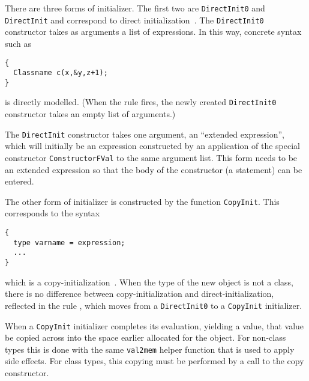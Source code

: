 \documentclass[11pt]{article}
\begin{document}
There are three forms of initializer.  The first two are
\texttt{DirectInit0} and \texttt{DirectInit} and correspond to direct
initialization~\cite[\S 8.5 paragraph 12]{cpp-standard-iso14882}.  The
\texttt{DirectInit0} constructor takes as arguments a list of
expressions.  In this way, concrete syntax such as
\begin{verbatim}
{
  Classname c(x,&y,z+1);
}
\end{verbatim}
is directly modelled.  (When the rule  fires,
the newly created \texttt{DirectInit0} constructor takes an empty list
of arguments.)

The \texttt{DirectInit} constructor takes one argument, an ``extended
expression'', which will initially be an expression constructed by an
application of the special constructor
\texttt{ConstructorFVal}
to the same argument list.  This form needs to be an extended
expression so that the body of the constructor (a statement) can be
entered.

The other form of initializer is constructed by the function
\texttt{CopyInit}.  This corresponds to the syntax
\begin{verbatim}
{
  type varname = expression;
  ...
}
\end{verbatim}
which is a
copy-initialization~\cite[\emph{ibid}]{cpp-standard-iso14882}.  When
the type of the new object is not a class, there is no difference
between copy-initialization and direct-initialization, reflected in
the rule , which
moves from a \texttt{DirectInit0} to a \texttt{CopyInit} initializer.

When a \texttt{CopyInit} initializer completes its evaluation,
yielding a value, that value be copied across into the space earlier
allocated for the object.  For non-class types this is done with the
same \texttt{val2mem} helper function that is used to apply side
effects.  For class types, this copying must be performed by a call to
the copy constructor.
\end{document}
